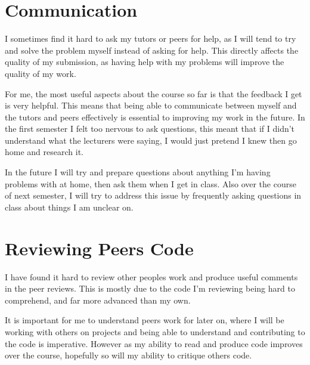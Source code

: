 \documentclass{scrartcl}
\begin{document}
\section{Communication}
I sometimes find it hard to ask my tutors or peers for help, as I will tend to try and solve the problem myself instead of asking for help. This directly affects the quality of my submission, as having help with my problems will improve the quality of my work.

For me, the most useful aspects about the course so far is that the feedback I get is very helpful. This means that being able to communicate between myself and the tutors and peers effectively is essential to improving my work in the future. In the first semester I felt too nervous to ask questions, this meant that if I didn't understand what the lecturers were saying, I would just pretend I knew then go home and research it.

In the future I will try and prepare questions about anything I'm having problems with at home, then ask them when I get in class. Also over the course of next semester, I will try to address this issue by frequently asking questions in class about things I am unclear on.

\section{Reviewing Peers Code}
I have found it hard to review other peoples work and produce useful comments in the peer reviews. This is mostly due to the code I'm reviewing being hard to comprehend, and far more advanced than my own.

It is important for me to understand peers work for later on, where I will be working with others on projects and being able to understand and contributing to the code is imperative. However as my ability to read and produce code improves over the course, hopefully so will my ability to critique others code.
\end{document}
